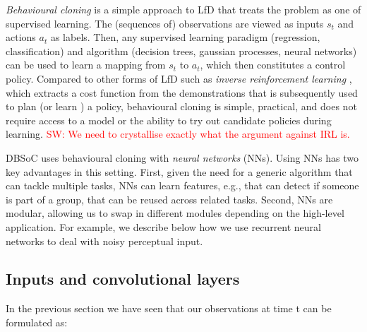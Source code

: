 \documentclass[letterpaper, 10 pt, conference]{ieeeconf}
\newcommand{\sw}[1]{\textcolor{red}{SW: #1}}
\begin{document}
\emph{Behavioural cloning} is a simple approach to LfD that treats the problem as one of supervised learning. The (sequences of) observations are viewed as inputs $s_t$ and actions $a_t$ as labels.  Then, any supervised learning paradigm (regression, classification) and algorithm (decision trees, gaussian processes, neural networks) \cite{bishop2006pattern} can be used to learn a mapping from $s_t$ to $a_t$, which then constitutes a control policy.  Compared to other forms of LfD such as \emph{inverse reinforcement learning} \cite{abbeel2004apprenticeship}, which extracts a cost function from the demonstrations that is subsequently used to plan (or learn \cite{boularias2011relative}) a policy, behavioural cloning is simple, practical, and does not require access to a model or the ability to try out candidate policies during learning. \sw{We need to crystallise exactly what the argument against IRL is.}

DBSoC uses behavioural cloning with \emph{neural networks} (NNs).  Using NNs has two key advantages in this setting.  First, given the need for a generic algorithm that can tackle multiple tasks, NNs can learn features, e.g., that can detect if someone is part of a group, that can be reused across related tasks.  Second, NNs are modular, allowing us to swap in different modules depending on the high-level application. For example, we describe below how we use
recurrent neural networks to deal with noisy perceptual input.



\subsection{Inputs and convolutional layers \label{subsec:meth_inp}}
In the previous section we have seen that our observations at time t can be formulated as:
\end{document}
